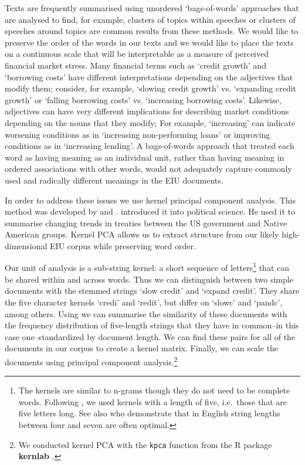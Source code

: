 \documentclass[]{article}
\begin{document}
Texts are frequently summarised using unordered `bags-of-words'
approaches that are analysed to find, for example, clusters of topics within speeches or clusters of speeches around topics \citep[for a review see][]{Grimmer2013} are common results from these methods. We would like to preserve the order of the words in our texts and we would like to place the texts on a continuous scale that will be interpretable as a measure of perceived financial market stress. Many financial terms such as `credit growth' and `borrowing costs' have different interpretations depending on the adjectives that modify them; consider, for example, `slowing credit growth' vs. `expanding credit growth' or `falling borrowing costs' vs. `increasing borrowing costs'. Likewise, adjectives can have very different implications for describing market conditions depending on the nouns that they modify;  For example, `increasing' can indicate worsening conditions as in `increasing non-performing loans' or improving conditions as in `increasing lending'.  A
bags-of-words approach that treated each word as having meaning as an individual unit, rather than having meaning in ordered associations with other words, would not adequately capture commonly used and radically different meanings in the EIU documents.

In order to address these issues we use kernel principal component analysis. This method was developed by \cite{Scholkopf1998} and \cite{lodhi2002}. \cite{Spirling2012} introduced it into political science. He used it to summarise changing trends in treaties between the US government and Native American groups. Kernel PCA allows us to extract structure from our likely high-dimensional EIU corpus \cite[6531--6537]{Zhang2010} while preserving word order.

Our unit of analysis is a sub-string kernel: a short sequence of letters\footnote{The kernels are similar to n-grams though they do not need to be complete words. Following \cite{Spirling2012}, we used kernels with a length of five, i.e.~those that are five letters long. See also \cite{lodhi2002} who demonstrate that in English string lengths between four and seven are often optimal.} that can be shared within and across words. Thus we can distinguish between two simple documents with the stemmed strings `slow credit' and `expand credit'. They share the five character kernels `credi' and `redit', but differ on `slowc' and `pandc', among others. Using \cite{lodhi2002} we can summarise the similarity of these documents with the frequency distribution of five-length strings that they have in common--in this case one--standardized by document length. We can find these pairs for all of the documents in our corpus to create a kernel matrix. Finally, we can scale the documents using principal component analysis.\footnote{We conducted kernel PCA with the \texttt{kpca} function from the R package \textbf{kernlab} \citep{kerblabCite}.}
\end{document}
